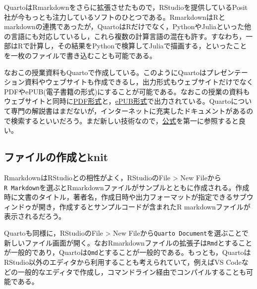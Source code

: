 \documentclass[
  a4paper,
]{ltjsbook}
\begin{document}
QuartoはRmarkdownをさらに拡張させたもので，RStudioを提供しているPosit社が今もっとも注力しているソフトのひとつである。RmarkdownはRとmarkdownの連携であったが，QuartoはRだけでなく，PythonやJuliaといった他の言語にも対応しているし，これら複数の計算言語の混在も許す。すなわち，一部はRで計算し，その結果をPythonで検算してJuliaで描画する，といったことを一枚のファイルで書き込むことも可能である。

なおこの授業資料もQuartoで作成している。このようにQuartoはプレゼンテーション資料やウェブサイトも作成できるし，出力形式もウェブサイトだけでなくPDFやePUB(電子書籍の形式)にすることが可能である。なおこの授業の資料もウェブサイトと同時に\href{EiPS.PDF}{PDF形式}と，\href{EiPS.epub}{ePUB形式}で出力されている。Quartoについて専門の解説書はまだないが，インターネットに充実したドキュメントがあるので検索するといいだろう。まだ新しい技術なので，\href{https://quarto.org/}{公式}を第一に参照すると良い。

\subsection{ファイルの作成とknit}\label{ux30d5ux30a1ux30a4ux30ebux306eux4f5cux6210ux3068knit}

RmarkdownはRStudioとの相性がよく，RStudioのFile \textgreater{} New
Fileから\texttt{R\ Markdown}を選ぶとRmarkdownファイルがサンプルとともに作成される。作成時に文書のタイトル，著者名，作成日時や出力フォーマットが指定できるサブウィンドゥが開き，作成するとサンプルコードが含まれたR
markdownファイルが表示されるだろう。

Quartoも同様に，RStudioのFile \textgreater{} New
Fileから\texttt{Quarto\ Document}を選ぶことで新しいファイル画面が開く。なおRmarkdownファイルの拡張子は\texttt{Rmd}とすることが一般的であり，Quartoは\texttt{Qmd}とすることが一般的である。もっとも，QuartoはRStudio以外のエディタから利用することも考えられていて，例えばVS
Codeなどの一般的なエディタで作成し，コマンドライン経由でコンパイルすることも可能である。
\end{document}
